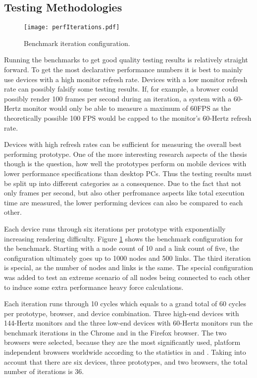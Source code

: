 \subsection{Testing Methodologies}

\begin{figure}
\centering
\texttt{[image: perfIterations.pdf]}
\caption{Benchmark iteration configuration.}
\label{fig:perfIterations}
\end{figure}

Running the benchmarks to get good quality testing results is relatively straight forward. To get the most declarative performance numbers it is best to mainly use devices with a high monitor refresh rate. Devices with a low monitor refresh rate can possibly falsify some testing results. If, for example, a browser could possibly render 100 frames per second during an iteration, a system with a 60-Hertz monitor would only be able to measure a maximum of 60FPS as the theoretically possible 100 FPS would be capped to the monitor's 60-Hertz refresh rate.

Devices with high refresh rates can be sufficient for measuring the overall best performing prototype. One of the more interesting research aspects of the thesis though is the question, how well the prototypes perform on mobile devices with lower performance specifications than desktop PCs. Thus the testing results must be split up into different categories as a consequence. Due to the fact that not only frames per second, but also other perfromance aspects like total execution time are measured, the lower performing devices can also be compared to each other.

Each device runs through six iterations per prototype with exponentially increasing rendering difficulty. Figure \ref{fig:perfIterations} shows the benchmark configuration for the benchmark. Starting with a node count of 10 and a link count of five, the configuration ultimately goes up to 1000 nodes and 500 links. The third iteration is special, as the number of nodes and links is the same. The special configuration was added to test an extreme scenario of all nodes being connected to each other to induce some extra performance heavy force calculations.

Each iteration runs through 10 cycles which equals to a grand total of 60 cycles per prototype, browser, and device combination. Three high-end devices with 144-Hertz monitors and the three low-end devices with 60-Hertz monitors run the benchmark iterations in the Chrome and in the Firefox browser. The two browsers were selected, because they are the most significantly used, platform independent browsers worldwide according to the statistics in \cite{StatCounterBrowserMarketShare} and \cite{W3CBrowserMarketShare}. Taking into account that there are six devices, three prototypes, and two browsers, the total number of iterations is 36.

